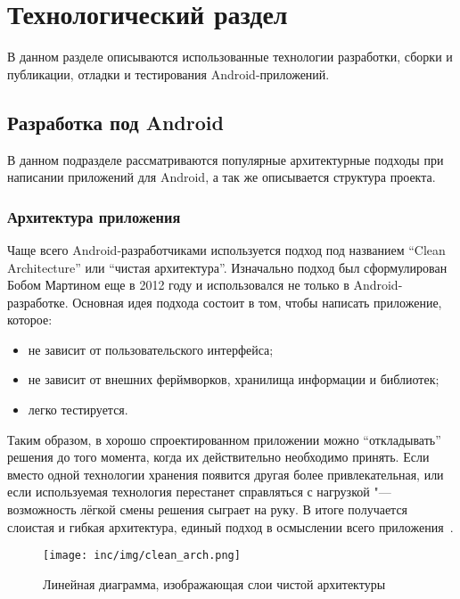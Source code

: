 \chapter{Технологический раздел}
\label{ch:tech}
В данном разделе описываются использованные технологии разработки, сборки и публикации, отладки и тестирования Android-приложений.

\section{Разработка под Android}
\label{sec:dev}
В данном подразделе рассматриваются популярные архитектурные подходы при написании приложений для Android, а так же описывается структура проекта.

\subsection{Архитектура приложения}
\label{subsec:arch}

Чаще всего Android-разработчиками используется подход под названием ``Clean Architecture'' или ``чистая архитектура''.
Изначально подход был сформулирован Бобом Мартином еще в 2012 году\cite{martin:clean} и использовался не только в Android-разработке.
Основная идея подхода состоит в том, чтобы написать приложение, которое:
\begin{itemize}
  \item не зависит от пользовательского интерфейса;
  \item не зависит от внешних ферймворков, хранилища информации и библиотек;
  \item легко тестируется.
\end{itemize}

Таким образом, в хорошо спроектированном приложении можно ``откладывать'' решения до того момента, когда их действительно необходимо принять.
Если вместо одной технологии хранения появится другая более привлекательная, или если используемая технология перестанет справляться с нагрузкой "--- возможность лёгкой смены решения сыграет на руку.
В итоге получается слоистая и гибкая архитектура, единый подход в осмыслении всего приложения~\cite{gihub:androidArch}.

\begin{figure}[ht]
  \centering
  \texttt{[image: inc/img/clean\_arch.png]}
  \caption{Линейная диаграмма, изображающая слои чистой архитектуры}
  \label{fig:cleanArch}
\end{figure}

